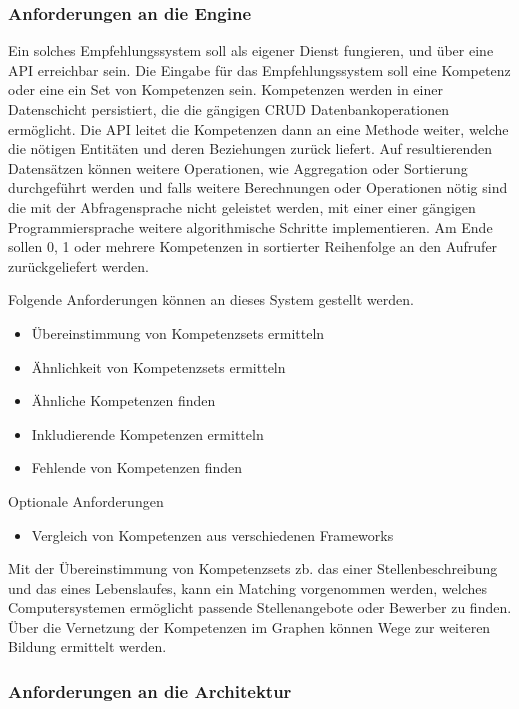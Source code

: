 \subsubsection{Anforderungen an die Engine}
Ein solches Empfehlungssystem soll als eigener Dienst fungieren, und über eine API erreichbar sein. Die Eingabe für das Empfehlungssystem soll eine Kompetenz oder eine ein Set von Kompetenzen sein. Kompetenzen werden in einer Datenschicht persistiert, die die gängigen CRUD Datenbankoperationen ermöglicht. Die API leitet die Kompetenzen dann an eine Methode weiter, welche die nötigen Entitäten und deren Beziehungen zurück liefert. Auf resultierenden Datensätzen können weitere Operationen, wie Aggregation oder Sortierung durchgeführt werden und falls weitere Berechnungen oder Operationen nötig sind die mit der Abfragensprache nicht geleistet werden, mit einer einer gängigen Programmiersprache weitere algorithmische Schritte implementieren. Am Ende sollen 0, 1 oder mehrere Kompetenzen in sortierter Reihenfolge an den Aufrufer zurückgeliefert werden.

Folgende Anforderungen können an dieses System gestellt werden.
\begin{itemize}
	\item Übereinstimmung von Kompetenzsets ermitteln
	\item Ähnlichkeit von Kompetenzsets ermitteln
	\item Ähnliche Kompetenzen finden
	\item Inkludierende Kompetenzen ermitteln
	\item Fehlende von Kompetenzen finden
\end{itemize}

Optionale Anforderungen

\begin{itemize}
	\item Vergleich von Kompetenzen aus verschiedenen Frameworks
\end{itemize}


Mit der Übereinstimmung von Kompetenzsets zb. das einer Stellenbeschreibung und das eines Lebenslaufes, kann ein Matching vorgenommen werden, welches Computersystemen ermöglicht passende Stellenangebote oder Bewerber zu finden. Über die Vernetzung der Kompetenzen im Graphen können Wege zur weiteren Bildung ermittelt werden.


\subsubsection{Anforderungen an die Architektur}

